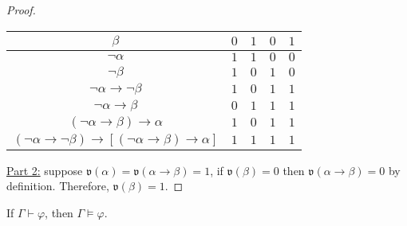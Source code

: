\documentclass{treatise}
\begin{document}
\begin{proof}
\begin{center}
\begin{tabular}{|c|cccc|}
        $\beta$ & $0$ & $1$ & $0$ & $1$ \\
        \hline
        $\neg \alpha$ & $1$ & $1$ & $0$ & $0$ \\
        $\neg \beta$ & $1$ & $0$ & $1$ & $0$ \\
        $\neg \alpha \to \neg \beta$ & $1$ & $0$ & $1$ & $1$ \\
        \hline
        $\neg \alpha \to \beta$ & $0$ & $1$ & $1$ & $1$ \\
        $(\neg \alpha \to \beta) \to \alpha$ & $1$ & $0$ & $1$ & $1$ \\
        \hline
        $(\neg \alpha \to \neg \beta) \to [(\neg \alpha \to \beta) \to \alpha]$ & $1$ & $1$ & $1$ & $1$ \\
        \hline
    \end{tabular}
\end{center}
\underline{Part 2:} suppose $\mathfrak{v}(\alpha) = \mathfrak{v}(\alpha \to \beta) = 1$, if $\mathfrak{v}(\beta) = 0$ then $\mathfrak{v}(\alpha \to \beta) = 0$ by definition. Therefore, $\mathfrak{v}(\beta) = 1$.
\end{proof}
\begin{theorem}
If $\Gamma \vdash \varphi$, then $\Gamma \vDash \varphi$.
\end{theorem}
\end{document}
